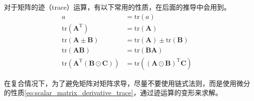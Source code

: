 对于矩阵的迹（trace）运算，有以下常用的性质，在后面的推导中会用到。
\begin{subequations}
	\begin{align}
		a &= \mathrm{tr}(a)
		\label{eq:matrix_trace_scalar} \\
		\mathrm{tr}(\bm{A}^{\mathrm{T}}) &= \mathrm{tr}(\bm{A})
		\label{eq:matrix_trace_transpose} \\
		\mathrm{tr}(\bm{A}\pm\bm{B}) &= \mathrm{tr}(\bm{A}) \pm \mathrm{tr}(\bm{B})
		\label{eq:matrix_trace_add_sub} \\
		\mathrm{tr}(\bm{AB}) &= \mathrm{tr}(\bm{BA})
		\label{eq:matrix_trace_mul} \\
		\mathrm{tr}\left(\bm{A}^{\mathrm{T}}(\bm{B} \odot \bm{C})\right) &= \mathrm{tr}\left((\bm{A} \odot \bm{B})^{\mathrm{T}}\bm{C}\right)
		\label{eq:matrix_trace_hadamard}
	\end{align}
\end{subequations}

在复合情况下，为了避免矩阵对矩阵求导，尽量不要使用链式法则，而是使用微分的性质\eqref{eq:scalar_matrix_derivative_trace}，通过迹运算的变形来求解。

